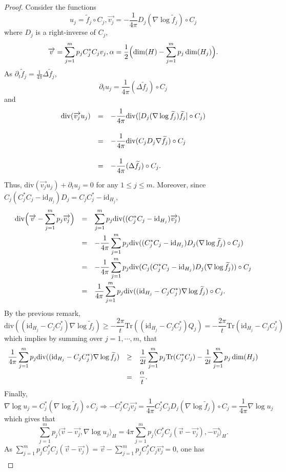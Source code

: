 \documentclass[11pt,a4paper,reqno]{amsart}
\numberwithin{equation}{section}
\theoremstyle{definition}
\newcommand{\nm}{\noalign{\smallskip}}
\newcommand{\ds}{\displaystyle}
\renewcommand{\tilde}{\widetilde}
\newcommand{\<}{\ensuremath \leq}
\renewcommand{\>}{\ensuremath \geq}
\renewcommand{\tilde}{\widetilde}
\begin{document}
\begin{proof}
Consider the functions $$u_j=\tilde f_j \circ C_j, \overrightarrow{v_j}=-\frac{1}{4\pi}D_j(\nabla \log \tilde f_j) \circ C_j$$ where $D_j$ is a right-inverse of $C_j$, $$\overrightarrow{v}=\sum_{j=1}^m p_jC_j^*C_jv_j, \alpha=\frac{1}{2}\Bigl(\dim(H)-\sum_{j=1}^m p_j \dim(H_j) \Bigl).$$ As $\partial_t \tilde f_j=\frac{1}{4\pi}\Delta \tilde f_j$, $$\partial_t u_j=\frac{1}{4\pi}(\Delta \tilde f_j)\circ C_j$$ and $$\begin{array}{lll}
    \mathrm{div}(\overrightarrow{v_j}u_j) &=& \ds -\frac{1}{4\pi}\mathrm{div}([D_j(\nabla \log \tilde f_j)\tilde f_j]\circ C_j)  \\ \\
    \nm
    &=& \ds -\frac{1}{4\pi}\mathrm{div}(C_jD_j\nabla \tilde f_j) \circ C_j \\ \\
    \nm 
    &=& \ds -\frac{1}{4\pi}(\Delta \tilde f_j)\circ C_j. \\
    \nm 
\end{array}$$ Thus, $\mathrm{div}(\overrightarrow{v_j}u_j)+\partial_t u_j=0$ for any $1 \leq j \leq m.$ Moreover, since $C_j(C_j^*C_j-\mathrm{id}_{H_j})D_j=C_jC_j^*-\mathrm{id}_{H_j}$, $$\begin{array}{lll}
\ds \mathrm{div}\Bigl(\overrightarrow{v}-\sum_{j=1}^m p_j\overrightarrow{v_j}\Bigl) &=& \ds \sum_{j=1}^m p_j \mathrm{div}((C_j^*C_j-\mathrm{id}_{H_j})\overrightarrow{v_j}) \\
\nm 
&=& \ds  -\frac{1}{4\pi}\sum_{j=1}^m p_j\mathrm{div}((C_j^*C_j-\mathrm{id}_{H_j})D_j(\nabla \log \tilde f_j)\circ C_j) \\
\nm 
&=& \ds -\frac{1}{4\pi}\sum_{j=1}^m p_j \mathrm{div}(C_j(C_j^*C_j-\mathrm{id}_{H_j})D_j(\nabla \log \tilde f_j))\circ C_j \\
\nm 
&=& \ds \frac{1}{4\pi}\sum_{j=1}^m p_j\mathrm{div}((\mathrm{id}_{H_j}-C_jC_j^*)\nabla \log \tilde f_j) \circ C_j.
\end{array}$$  By the previous remark, $$
\ds \mathrm{div}((\mathrm{id}_{H_j}-C_jC_j^*)\nabla \log \tilde f_j) \geq \ds -\frac{2\pi}{t}\mathrm{Tr}((\mathrm{id}_{H_j}-C_jC_j^*)Q_j)=-\frac{2\pi}{t}\mathrm{Tr}(\mathrm{id}_{H_j}-C_jC_j^*) 
$$ which implies by summing over $j=1,\cdots,m$, that $$\begin{array}{lll}
\ds \frac{1}{4\pi}\sum_{j=1}^m p_j\mathrm{div}((\mathrm{id}_{H_j}-C_jC_j^*)\nabla \log \tilde f_j) &\geq& \ds \frac{1}{2t}\sum_{j=1}^m p_j\mathrm{Tr}(C_j^*C_j)-\frac{1}{2t}\sum_{j=1}^m p_j\dim(H_j) \\
\nm
&=& \ds \frac{\alpha}{t}.
\end{array}$$ Finally, $$\nabla \log u_j=C_j^*(\nabla \log \tilde f_j)\circ C_j \Longrightarrow -C_j^*C_j\overrightarrow{v_j}=\frac{1}{4\pi}C_j^*C_jD_j(\nabla \log \tilde f_j)\circ C_j=\frac{1}{4\pi}\nabla \log u_j$$ which gives that $$\sum_{j=1}^m p_j\langle \overrightarrow{v}-\overrightarrow{v_j},\nabla \log u_j\rangle_H =4\pi \sum_{j=1}^m p_j \langle C_j^*C_j(\overrightarrow{v}-\overrightarrow{v_j}),-\overrightarrow{v_j}\rangle_H.$$  As $\sum_{j=1}^m p_jC_j^*C_j(\overrightarrow{v}-\overrightarrow{v_j})=\overrightarrow{v}-\sum_{j=1}^m p_jC_j^*C_j\overrightarrow{v_j}=0$, one has $$\begin{array}{lll}

\end{array}$$
\end{proof}
\end{document}
